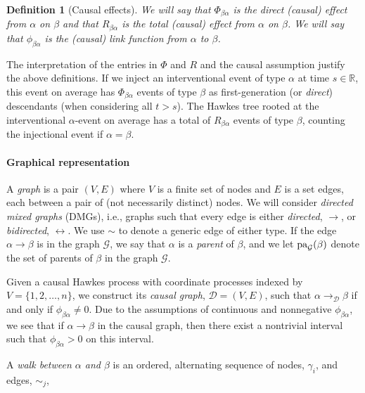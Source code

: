 \documentclass[accepted]{uai2021} %
\newtheorem{defn}[thm]{Definition}
\newcommand{\pa}{\textnormal{pa}}
\begin{document}
\begin{defn}[Causal effects]
	We will say that $\Phi_{\beta\alpha}$ is the \emph{direct (causal) effect} 
	from 
	$\alpha$ on $\beta$ and that $R_{\beta\alpha}$ is the \emph{total (causal) 
	effect} from $\alpha$ on $\beta$. We will say that $\phi_{\beta\alpha}$ is 
	the 
	{\it (causal) link function} from $\alpha$ to $\beta$.
	\label{def:cauEff}
\end{defn}

The interpretation of the entries in $\Phi$ and $R$ and the causal assumption 
justify the above definitions. If 
we inject an 
interventional event of type $\alpha$ at time $s \in \mathbb{R}$, this 
event on average has $\Phi_{\beta\alpha}$ events 
of type $\beta$ as first-generation (or \emph{direct}) descendants (when 
considering all $t > s$). The Hawkes tree rooted at the 
interventional $\alpha$-event on average has a total of $R_{\beta\alpha}$ 
events of 
type $\beta$, counting the injectional event if $\alpha=\beta$. 


\paragraph{Graphical representation}

A {\it graph} is a pair $(V,E)$ where $V$ is a finite set of nodes and $E$ is a 
set edges, each between a pair of (not necessarily distinct) nodes. We will  
consider {\it directed mixed graphs} (DMGs), i.e., graphs such that every edge 
is 
either \emph{directed}, $\rightarrow$, or \emph{bidirected}, $\leftrightarrow$. 
We use $\sim$ to denote a generic edge of either type. If the edge 
$\alpha\rightarrow\beta$ is in the graph $\mathcal{G}$, we say that $\alpha$ is 
a \emph{parent} of $\beta$, and we let $\pa_\mathcal{G}(\beta)$ denote the set 
of parents 
of $\beta$ in the graph $\mathcal{G}$.

Given a causal Hawkes process with coordinate processes indexed by $V = 
\{1,2,\ldots,n\}$, we construct its \emph{causal graph}, $\mathcal{D} = (V,E)$, 
such that 
$\alpha \rightarrow_\mathcal{D} \beta$ if and only if $\phi_{\beta\alpha} \neq 
0$. 
Due 
to the assumptions of continuous and nonnegative $\phi_{\beta\alpha}$, we see 
that if $\alpha\rightarrow\beta$ in the causal graph, then there exist a 
nontrivial interval such 
that $\phi_{\beta\alpha} > 0$ on this interval.

A {\it walk between $\alpha$ and $\beta$} is an ordered, alternating sequence 
of nodes, $\gamma_i$, and edges, $\sim_j$,
\end{document}
